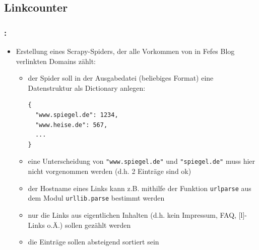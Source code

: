 \documentclass{beamer}
\begin{document}
\subsection{Linkcounter}
\begin{frame}[fragile]
	\frametitle{\insertsection{}: \insertsubsection{}}
	\begin{itemize}
		\item Erstellung eines Scrapy-Spiders, der alle Vorkommen von in Fefes Blog
		verlinkten Domains zählt: \begin{itemize}
			\item der Spider soll in der Ausgabedatei (beliebiges Format) eine Datenstruktur als Dictionary anlegen: \begin{lstlisting} 
{
  "www.spiegel.de": 1234,
  "www.heise.de": 567,
  ...
}
			\end{lstlisting}
		\item eine Unterscheidung von \lstinline|"www.spiegel.de"| und \lstinline|"spiegel.de"| muss hier nicht vorgenommen werden (d.h. 2 Einträge sind ok)
		\item der Hostname eines Links kann z.B. mithilfe der Funktion \lstinline|urlparse| aus dem Modul \lstinline|urllib.parse| bestimmt werden
		\item nur die Links aus eigentlichen Inhalten (d.h. kein Impressum, FAQ,
		[l]-Links o.Ä.) sollen gezählt werden
		\item die Einträge sollen absteigend sortiert sein
		\end{itemize}
	\end{itemize}
\end{frame}

\end{document}

